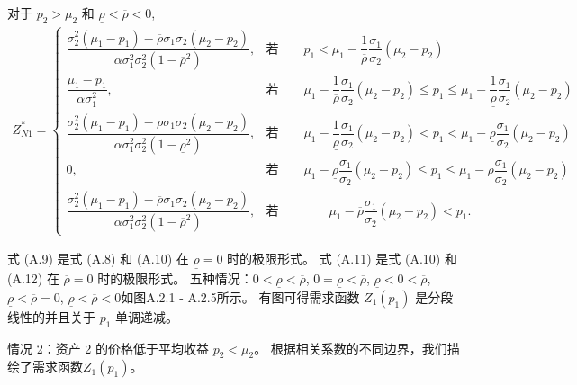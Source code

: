 \documentclass[10.0pt]{article}
\begin{document}
对于 $ p_2 > \mu_2 $ 和 $ \underline{\rho} < \overline{\rho} < 0 $,
{\footnotesize \begin{eqnarray}
Z_{N 1}^* = \left\{ \begin{matrix}
\dfrac{\sigma_2^2 (\mu_1 - p_1) - \overline{\rho} \sigma_1 \sigma_2 (\mu_2 - p_2)}{\alpha \sigma_1^2 \sigma_2^2 (1 - \overline{\rho}^2)}, & \text{若} \qquad p_1 < \mu_1 - \dfrac1{\overline{\rho}} \dfrac{\sigma_1}{\sigma_2} (\mu_2 - p_2) \\
\dfrac{\mu_1 - p_1}{\alpha \sigma_1^2}, & \text{若} \qquad \mu_1 - \dfrac1{\overline{\rho}} \dfrac{\sigma_1}{\sigma_2} (\mu_2 - p_2) \leqslant p_1 \leqslant \mu_1 - \dfrac1{\underline{\rho}} \dfrac{\sigma_1}{\sigma_2} (\mu_2 - p_2) \\
\dfrac{\sigma_2^2 (\mu_1 - p_1) - \underline{\rho} \sigma_1 \sigma_2 (\mu_2 - p_2)}{\alpha \sigma_1^2 \sigma_2^2 (1 - \underline{\rho}^2)}, & \text{若} \qquad \mu_1 - \dfrac1{\underline{\rho}} \dfrac{\sigma_1}{\sigma_2} (\mu_2 - p_2) < p_1 < \mu_1 - \underline{\rho} \dfrac{\sigma_1}{\sigma_2} (\mu_2 - p_2) \\
0, & \text{若} \qquad \mu_1 - \underline{\rho} \dfrac{\sigma_1}{\sigma_2} (\mu_2 - p_2) \leqslant p_1 \leqslant \mu_1 - \overline{\rho} \dfrac{\sigma_1}{\sigma_2} (\mu_2 - p_2) \\
\dfrac{\sigma_2^2 (\mu_1 - p_1) - \overline{\rho} \sigma_1 \sigma_2 (\mu_2 - p_2)}{\alpha \sigma_1^2 \sigma_2^2 (1 - \overline{\rho}^2)}, & \text{若} \qquad \qquad \mu_1 - \overline{\rho} \dfrac{\sigma_1}{\sigma_2} (\mu_2 - p_2) < p_1.
\end{matrix} \right.
\end{eqnarray}}



式 (A.9) 是式 (A.8) 和 (A.10) 在 $ \underline{\rho} = 0 $ 时的极限形式。
式 (A.11) 是式 (A.10) 和 (A.12) 在 $ \overline{\rho} = 0 $ 时的极限形式。
五种情况：$0 < \underline{\rho} < \overline{\rho} $, $ 0 = \underline{\rho} < \overline{\rho} $, $ \underline{\rho} < 0 < \overline{\rho} $, $ \underline{\rho} < \overline{\rho} = 0 $, $ \underline{\rho} < \overline{\rho} < 0 $如图A.2.1 - A.2.5所示。 有图可得需求函数 $ Z_1 (p_1) $ 是分段线性的并且关于 $ p_1 $ 单调递减。

情况 2：资产 2 的价格低于平均收益 $ p_2 < \mu_2 $。 根据相关系数的不同边界，我们描绘了需求函数$Z_1(p_1)$。
\end{document}
